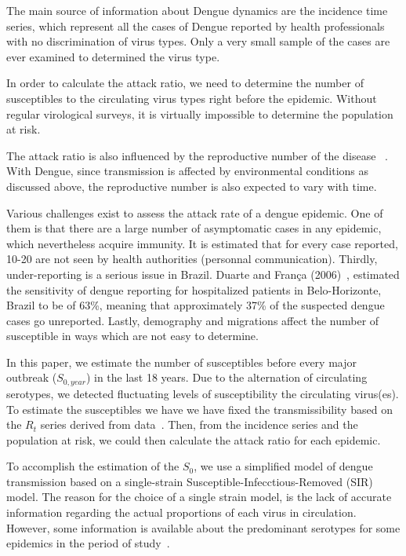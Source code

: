 The main source of information about Dengue dynamics are the incidence 
time series, which represent all the cases of Dengue reported by health 
professionals with no discrimination of virus types.
Only a very small sample 
of the cases are ever examined to determined the virus type.

In order to calculate the attack ratio, we need to determine the number of 
susceptibles to the circulating virus types right before the epidemic.
Without 
regular virological surveys, it is virtually impossible to determine the 
population at risk.

The attack ratio is also influenced by the reproductive number of the disease 
~\cite{bacaer_final_2009, katriel_attack_2012}.
With Dengue, since transmission 
is affected by environmental conditions as discussed above, the reproductive 
number is also expected to vary with time.

Various challenges exist to assess the attack rate of a dengue epidemic. 
One of 
them is that there are a large number of asymptomatic cases in any epidemic, 
which nevertheless acquire immunity.
It is estimated that for 
every case reported, 10-20 are not seen by health authorities (personnal 
communication).
Thirdly, under-reporting is a serious issue in Brazil. 
Duarte and Fran\c{c}a (2006)~\cite{duarte_data_2006}, estimated 
the sensitivity of dengue reporting for hospitalized patients in 
Belo-Horizonte, Brazil to be of 63\%, 
meaning that approximately 37\% of the suspected dengue cases go unreported.  
Lastly, demography and migrations affect the number of susceptible in ways which 
are not easy to determine.


In this paper, we estimate the number of susceptibles before every major 
outbreak ($S_{0, year}$) in the last 18 years.
Due to the alternation of circulating serotypes, we detected fluctuating levels 
of susceptibility the circulating virus(es).
To estimate the susceptibles we have we have fixed the 
transmissibility based on the $R_t$ series derived from data~\cite{nishiura}. 
Then, 
from the incidence series and the population at risk, we could then calculate 
the attack ratio for each epidemic.

To accomplish the estimation of the $S_0$, we use a simplified model of 
dengue transmission based on a single-strain Susceptible-Infecctious-Removed 
(SIR) model.
The reason for the choice of a single strain model, is the lack of 
accurate information regarding the actual proportions of each virus in 
circulation.
However, some information is available about the predominant 
serotypes for some epidemics in the period 
of study~\cite{macedo_virological_2013}. 

